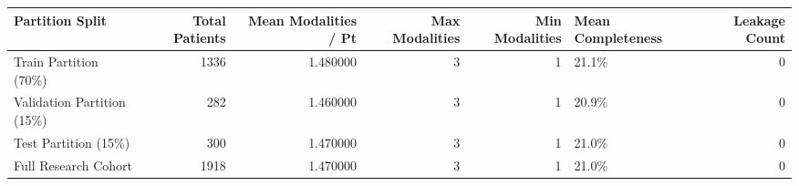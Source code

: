 \begin{tabular}{lrrrrlr}
\toprule
Partition Split & Total Patients & Mean Modalities / Pt & Max Modalities & Min Modalities & Mean Completeness & Leakage Count \\
\midrule
Train Partition (70\%) & 1336 & 1.480000 & 3 & 1 & 21.1\% & 0 \\
Validation Partition (15\%) & 282 & 1.460000 & 3 & 1 & 20.9\% & 0 \\
Test Partition (15\%) & 300 & 1.470000 & 3 & 1 & 21.0\% & 0 \\
Full Research Cohort & 1918 & 1.470000 & 3 & 1 & 21.0\% & 0 \\
\bottomrule
\end{tabular}
